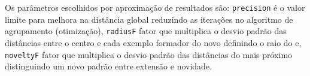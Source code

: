 Os parâmetros escolhidos por aproximação de resultados são:
\texttt{precision} é o valor limite para melhora na distância global reduzindo as 
iterações no algoritmo de agrupamento (otimização),
\texttt{radiusF} fator que multiplica o desvio padrão das distâncias entre o
centro e cada exemplo formador do novo \mcluster definindo o raio do \mcluster
e,
\texttt{noveltyF} fator que multiplica o desvio padrão das distâncias do
\mcluster mais próximo distinguindo um novo padrão entre extensão e novidade.









